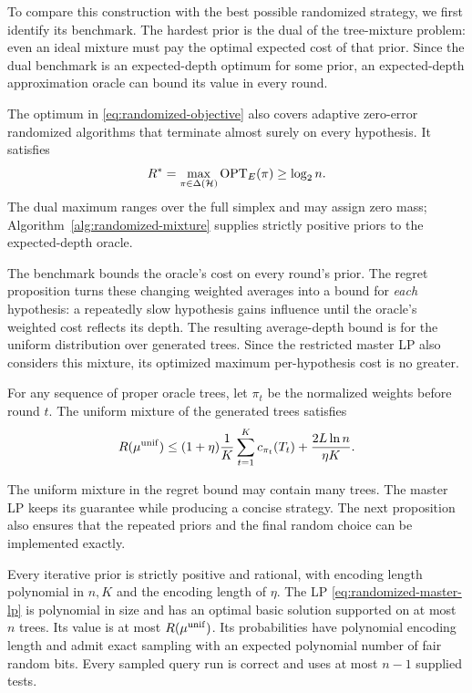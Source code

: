 To compare this construction with the best possible randomized
strategy, we first identify its benchmark. The hardest prior is the
dual of the tree-mixture problem: even an ideal mixture must pay
the optimal expected cost of that prior. Since the dual benchmark is
an expected-depth optimum for some prior, an expected-depth
approximation oracle can bound its value in every round.
\begin{proposition}
\label{prop:randomized-duality}
The optimum in \eqref{eq:randomized-objective} also covers adaptive
zero-error randomized algorithms that terminate almost surely on
every hypothesis. It satisfies
\begin{equation}\label{eq:randomized-duality}
 R^*=\max_{\pi\in\Delta(\mathcal H)}\operatorname{OPT}_E(\pi)
       \ge\log_2n.
\end{equation}
The dual maximum ranges over the full simplex and may assign zero
mass; Algorithm~\ref{alg:randomized-mixture} supplies strictly positive
priors to the expected-depth oracle.
\end{proposition}

The benchmark bounds the oracle's cost on every round's prior.
The regret proposition turns these changing weighted averages into a
bound for \emph{each} hypothesis: a repeatedly slow hypothesis gains
influence until the oracle's weighted cost reflects its depth. The
resulting average-depth bound is for the uniform distribution over
generated trees. Since the restricted master LP also considers this
mixture, its optimized maximum per-hypothesis cost is no greater.
\begin{proposition}
\label{prop:randomized-regret}
For any sequence of proper oracle trees, let $\pi_t$ be the normalized
weights before round $t$. The uniform mixture of the generated trees
satisfies
\begin{equation}\label{eq:randomized-regret}
 R(\mu^{\rm unif})\le
    (1+\eta)\frac1K\sum_{t=1}^K c_{\pi_t}(T_t)
    +\frac{2L\ln n}{\eta K}.
\end{equation}
\end{proposition}

The uniform mixture in the regret bound may contain many trees.
The master LP keeps its guarantee while producing a concise
strategy. The next proposition also ensures that the repeated
priors and the final random choice can be implemented exactly.
\begin{proposition}
\label{prop:randomized-compression}
Every iterative prior is strictly positive and rational, with encoding
length polynomial in $n,K$ and the encoding length of $\eta$.
The LP \eqref{eq:randomized-master-lp} is polynomial in size and has an
optimal basic solution supported on at most $n$ trees. Its value is
at most $R(\mu^{\rm unif})$. Its probabilities have polynomial encoding
length and admit exact sampling with an expected polynomial number
of fair random bits. Every sampled query run is correct and uses at
most $n-1$ supplied tests.
\end{proposition}

